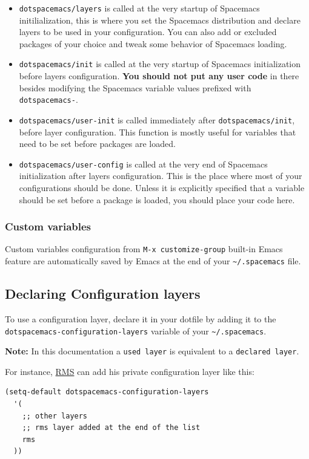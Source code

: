 \documentclass[11pt]{article}
\begin{document}
\begin{itemize}
\item \texttt{dotspacemacs/layers} is called at the very startup of Spacemacs initilialization,
this is where you set the Spacemacs distribution and declare layers to be used
in your configuration. You can also add or excluded packages of your choice
and tweak some behavior of Spacemacs loading.
\item \texttt{dotspacemacs/init} is called at the very startup of Spacemacs initialization
before layers configuration. \textbf{You should not put any user code} in there
besides modifying the Spacemacs variable values prefixed with \texttt{dotspacemacs-}.
\item \texttt{dotspacemacs/user-init} is called immediately after \texttt{dotspacemacs/init},
before layer configuration. This function is mostly useful for variables
that need to be set before packages are loaded.
\item \texttt{dotspacemacs/user-config} is called at the very end of Spacemacs
initialization after layers configuration. This is the place where most of
your configurations should be done. Unless it is explicitly specified that a
variable should be set before a package is loaded, you should place your code
here.
\end{itemize}

\subsubsection{Custom variables}
\label{sec:org451b373}
Custom variables configuration from \texttt{M-x customize-group} built-in Emacs feature
are automatically saved by Emacs at the end of your \texttt{\textasciitilde{}/.spacemacs} file.

\subsection{Declaring Configuration layers}
\label{sec:org25c21c8}
To use a configuration layer, declare it in your dotfile by adding it to the
\texttt{dotspacemacs-configuration-layers} variable of your \texttt{\textasciitilde{}/.spacemacs}.

\textbf{Note:} In this documentation a \texttt{used layer} is equivalent to a \texttt{declared
layer}.

For instance, \hyperref[sec:org841ff48]{RMS} can add his private configuration layer like this:

\begin{verbatim}
(setq-default dotspacemacs-configuration-layers
  '(
    ;; other layers
    ;; rms layer added at the end of the list
    rms
  ))
\end{verbatim}
\end{document}
